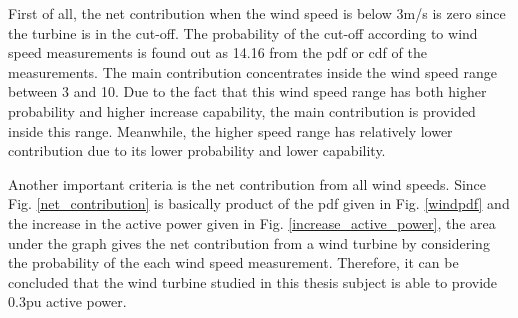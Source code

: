 First of all, the net contribution when the wind speed is below 3m/s is zero since the turbine is in the cut-off. The probability of the cut-off according to wind speed measurements is found out as 14.16 from the pdf or cdf of the measurements. The main contribution concentrates inside the wind speed range between 3 and 10. Due to the fact that this wind speed range has both higher probability and higher increase capability, the main contribution is provided inside this range. Meanwhile, the higher speed range has relatively lower contribution due to its lower probability and lower capability. \par
Another important criteria is the net contribution from all wind speeds. Since Fig. \ref{net_contribution} is basically product of the pdf given in Fig. \ref{windpdf} and the increase in the active power given in Fig. \ref{increase_active_power}, the area under the graph gives the net contribution from a wind turbine by considering the probability of the each wind speed measurement. Therefore, it can be concluded that the wind turbine studied in this thesis subject is able to provide 0.3pu active power.
